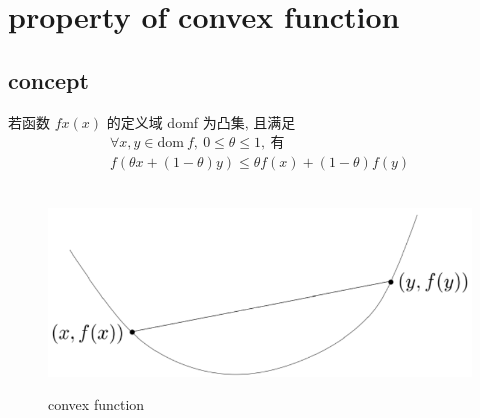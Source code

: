 \documentclass[oneside, 12pt]{ctexbook}
\begin{document}
		\section{\quad property of convex function}
			\subsection{\quad concept}
				若函数 $fx(x)$ 的定义域 domf 为凸集, 且满足
				\begin{align}
					\forall x, y \in \text{dom} \ f, \ 0 \leq \theta \leq 1, \ \text{有}\\
					f(\theta x + (1-\theta)y) \leq \theta f(x) + (1-\theta)f(y)
				\end{align}
				\begin{figure}[H]
					\vspace{-0.6cm}  %
					\setlength{\abovecaptionskip}{-0.2cm}   %
					\centering
					\includegraphics[scale=0.6]{convex_function.png}
					\renewcommand{\figurename}{Fig} %
					\caption{convex function}
					\label{fig:7}
				\end{figure}
					
\end{document}
